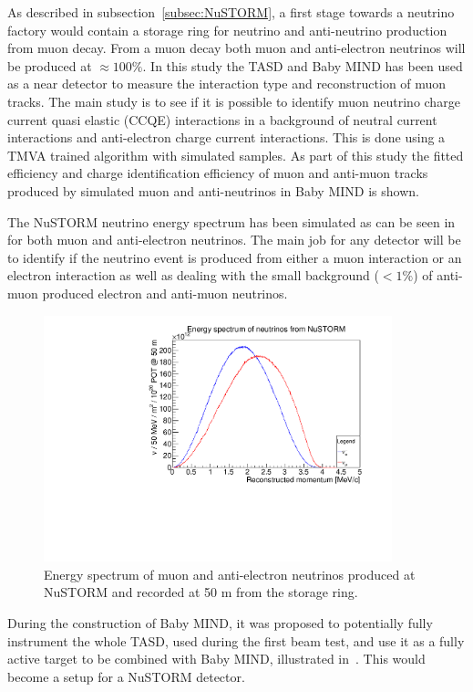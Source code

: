 As described in subsection~\ref{subsec:NuSTORM}, a first stage towards a neutrino factory would contain a storage ring for neutrino and anti-neutrino production from muon decay. From a muon decay both muon and anti-electron neutrinos will be produced at $\approx 100\%$. In this study the TASD and Baby MIND has been used as a near detector to measure the interaction type and reconstruction of muon tracks. The main study is to see if it is possible to identify muon neutrino charge current quasi elastic (CCQE) interactions in a background of neutral current interactions and anti-electron charge current interactions. This is done using a TMVA trained algorithm with simulated samples. As part of this study the fitted efficiency and charge identification efficiency of muon and anti-muon tracks produced by simulated muon and anti-neutrinos in Baby MIND is shown.

The NuSTORM neutrino energy spectrum has been simulated as can be seen in  for both muon and anti-electron neutrinos. The main job for any detector will be to identify if the neutrino event is produced from either a muon interaction or an electron interaction as well as dealing with the small background ($<1\%$) of anti-muon produced electron and anti-muon neutrinos.

\begin{figure}[h!]
\centering
\includegraphics[width=0.9\textwidth]{figures/eSpectrum.pdf}
\caption{Energy spectrum of muon and anti-electron neutrinos produced at NuSTORM and recorded at 50 m from the storage ring.}
\label{fig:NuSTORMeSpectrum}
\end{figure}

During the construction of Baby MIND, it was proposed to potentially fully instrument the whole TASD, used during the first beam test, and use it as a fully active target to be combined with Baby MIND, illustrated in~. This would become a setup for a NuSTORM detector.

